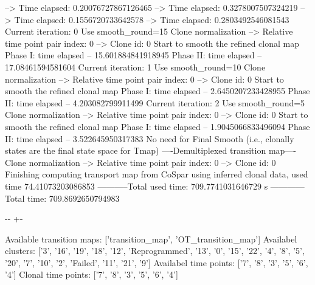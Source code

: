 \documentclass[letterpaper,10pt,english]{sphinxmanual}
\newlength\nbsphinxcodecellspacing
\begin{document}
{\begin{sphinxVerbatim}[commandchars=\\\{\}]
--> Time elapsed:  0.20076727867126465
--> Time elapsed:  0.3278007507324219
--> Time elapsed:  0.1556720733642578
--> Time elapsed:  0.2803492546081543
Current iteration: 0
Use smooth\_round=15
Clone normalization
--> Relative time point pair index: 0
--> Clone id: 0
Start to smooth the refined clonal map
Phase I: time elapsed --  15.601884841918945
Phase II: time elapsed --  17.08461594581604
Current iteration: 1
Use smooth\_round=10
Clone normalization
--> Relative time point pair index: 0
--> Clone id: 0
Start to smooth the refined clonal map
Phase I: time elapsed --  2.6450207233428955
Phase II: time elapsed --  4.203082799911499
Current iteration: 2
Use smooth\_round=5
Clone normalization
--> Relative time point pair index: 0
--> Clone id: 0
Start to smooth the refined clonal map
Phase I: time elapsed --  1.9045066833496094
Phase II: time elapsed --  3.522645950317383
No need for Final Smooth (i.e., clonally states are the final state space for Tmap)
----Demultiplexed transition map----
Clone normalization
--> Relative time point pair index: 0
--> Clone id: 0
Finishing computing transport map from CoSpar using inferred clonal data, used time 74.41073203086853
-----------Total used time: 709.7741031646729 s ------------
Total time: 709.8692650794983
\end{sphinxVerbatim}
}

{
\begin{sphinxVerbatim}[commandchars=\\\{\}]
\llap{\color{nbsphinxin}[31]:\,\hspace{\fboxrule}\hspace{\fboxsep}}
\end{sphinxVerbatim}
}

{

\kern-\sphinxverbatimsmallskipamount\kern-\baselineskip
\kern+\FrameHeightAdjust\kern-\fboxrule
\vspace{\nbsphinxcodecellspacing}

\begin{sphinxVerbatim}[commandchars=\\\{\}]
Available transition maps: ['transition\_map', 'OT\_transition\_map']
Availabel clusters: ['3', '16', '19', '18', '12', 'Reprogrammed', '13', '0', '15', '22', '4', '8', '5', '20', '7', '10', '2', 'Failed', '11', '21', '9']
Availabel time points: ['7', '8', '3', '5', '6', '4']
Clonal time points: ['7', '8', '3', '5', '6', '4']
\end{sphinxVerbatim}
}
\end{document}
